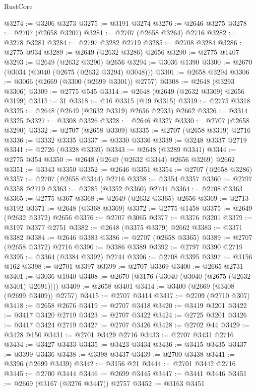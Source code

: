 \begin{lexlean}{RustCore}
\begin{coremodule}
@3274 := @3206 @3273
@3275 := @3191 @3274
@3276 := @2646 @3275
@3278 := @2707 (@2658 @3207)
@3281 := @2707 (@2658 @3264) @2716
@3282 := @3278 @3281
@3284 := @2797 @3282 @2719
@3285 := @2708 @3284
@3286 := @2775 @934
@3289 := @2649 (@2632 @3286) @2656
@3290 := @2775 @1407
@3293 := @2649 (@2632 @3290) @2656
@3294 := @3036 @1390
@3300 := @2670 (@3034 (@3040 (@2675 (@2632 @3294) @3048)))
@3301 := @2658 @3294
@3306 := @3066 (@2669 (@3300 (@2699 @3301)) @2757)
@3308 := @2648 (@3293 @3306)
@3309 := @2775 @545
@3314 := @2648 (@2649 (@2632 @3309) @2656 @3199)
@3315 := 31
@3318 := @16 @3315 (@19 @3315)
@3319 := @2775 @3318
@3325 := @2648 (@2649 (@2632 @3319) @2656 @2933) @2662
@3326 := @3314 @3325
@3327 := @3308 @3326
@3328 := @2646 @3327
@3330 := @2707 (@2658 @3290)
@3332 := @2707 (@2658 @3309)
@3335 := @2707 (@2658 @3319) @2716
@3336 := @3332 @3335
@3337 := @3330 @3336
@3339 := @3248 @3337 @2719
@3341 := @2726 (@3328 @3339)
@3343 := @2648 (@3289 @3341)
@3344 := @2775 @354
@3350 := @2648 (@2649 (@2632 @3344) @2656 @3269) @2662
@3351 := @3343 @3350
@3352 := @2646 @3351
@3354 := @2707 (@2658 @3286)
@3357 := @2707 (@2658 @3344) @2716
@3358 := @3354 @3357
@3360 := @2797 @3358 @2719
@3363 := @3285 (@3352 @3360) @2744
@3364 := @2708 @3363
@3365 := @2775 @367
@3368 := @2649 (@2632 @3365) @2656
@3369 := @2713 @3192
@3371 := @2648 (@3368 @3369)
@3372 := @2775 @1458
@3375 := @2649 (@2632 @3372) @2656
@3376 := @2707 @3065
@3377 := @3376 @3201
@3379 := @3197 @3377 @2751
@3382 := @2648 (@3375 @3379) @2662
@3383 := @3371 @3382
@3384 := @2646 @3383
@3386 := @2707 (@2658 @3365)
@3389 := @2707 (@2658 @3372) @2716
@3390 := @3386 @3389
@3392 := @2797 @3390 @2719
@3395 := @3364 (@3384 @3392) @2744
@3396 := @2708 @3395
@3397 := @3156 @162
@3398 := @2701 @3397
@3399 := @2707 @3369
@3400 := @2665 @2731
@3401 := @3036 @1040
@3408 := @2670 (@3176 (@3040 (@3040 (@2675 (@2632 @3401) @2691))))
@3409 := @2658 @3401
@3414 := @3400 (@2669 (@3408 (@2699 @3409)) @2757)
@3415 := @2707 @3414
@3417 := @2709 (@2710 @307)
@3418 := @2658 @2676
@3419 := @2707 @3418
@3420 := @3419 @3201
@3422 := @3417 @3420 @2719
@3423 := @2707 @3422
@3424 := @2725 @3201
@3426 := @3417 @3424 @2719
@3427 := @2707 @3426
@3428 := @2702 @44
@3429 := @3428 @150
@3431 := @2701 @3429 @2716
@3433 := @2707 @3431 @2716
@3434 := @3427 @3433
@3435 := @3423 @3434
@3436 := @3415 @3435
@3437 := @3399 @3436
@3438 := @3398 @3437
@3439 := @2700 @3438
@3441 := @3396 (@2699 @3439)
@3442 := @3156 @21
@3444 := @2701 @3442 @2716
@3445 := @2700 @3444
@3446 := @2699 @3445
@3447 := @3441 @3446
@3451 := @2669 (@3167 (@3276 @3447)) @2757
@3452 := @3163 @3451

\end{coremodule}
\end{lexlean}
